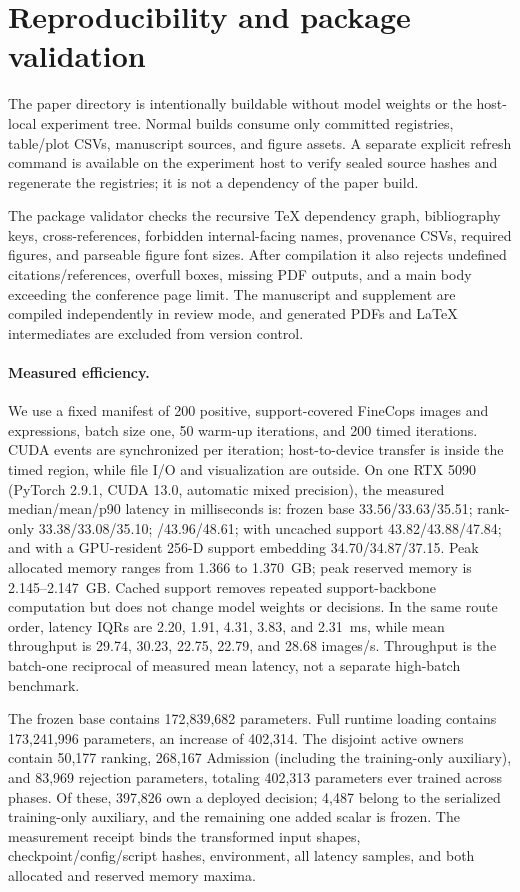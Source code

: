 \section{Reproducibility and package validation}
\label{sup:reproducibility}

The paper directory is intentionally buildable without model weights or the
host-local experiment tree.  Normal builds consume only committed registries,
table/plot CSVs, manuscript sources, and figure assets.  A separate explicit
refresh command is available on the experiment host to verify sealed source
hashes and regenerate the registries; it is not a dependency of the paper
build.

The package validator checks the recursive TeX dependency graph, bibliography
keys, cross-references, forbidden internal-facing names, provenance CSVs,
required figures, and parseable figure font sizes.  After compilation it also
rejects undefined citations/references, overfull boxes, missing PDF outputs,
and a main body exceeding the conference page limit.  The manuscript and
supplement are compiled independently in review mode, and generated PDFs and
LaTeX intermediates are excluded from version control.

\paragraph{Measured efficiency.}
We use a fixed manifest of 200 positive, support-covered FineCops images and
expressions, batch size one, 50 warm-up iterations, and 200 timed iterations.
CUDA events are synchronized per iteration; host-to-device transfer is inside
the timed region, while file I/O and visualization are outside.  On one RTX
5090 (PyTorch 2.9.1, CUDA 13.0, automatic mixed precision), the measured
median/mean/p90 latency in milliseconds is: frozen base
33.56/33.63/35.51; rank-only 33.38/33.08/35.10; /43.96/48.61; \arrowv with uncached support
43.82/43.88/47.84; and \arrowv with a GPU-resident 256-D support embedding
34.70/34.87/37.15.  Peak allocated memory ranges from 1.366 to 1.370~GB;
peak reserved memory is 2.145--2.147~GB.  Cached support removes repeated
support-backbone computation but does not change model weights or decisions.
In the same route order, latency IQRs are 2.20, 1.91, 4.31, 3.83, and
2.31~ms, while mean throughput is 29.74, 30.23, 22.75, 22.79, and
28.68 images/s.  Throughput is the batch-one reciprocal of measured mean
latency, not a separate high-batch benchmark.

The frozen base contains 172,839,682 parameters.  Full runtime loading contains
173,241,996 parameters, an increase of 402,314.  The disjoint active owners
contain 50,177 ranking, 268,167 Admission (including the training-only
auxiliary), and 83,969 rejection parameters, totaling 402,313 parameters ever
trained across phases.  Of these, 397,826 own a deployed decision; 4,487 belong
to the serialized training-only auxiliary, and the remaining one added scalar
is frozen.  The measurement receipt binds the transformed input shapes,
checkpoint/config/script hashes, environment, all latency samples, and both
allocated and reserved memory maxima.
